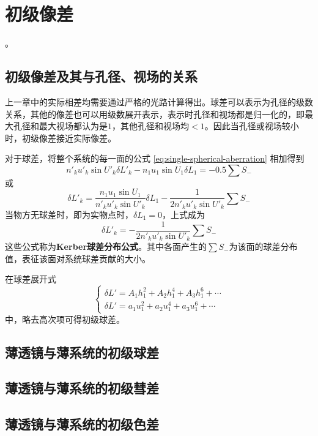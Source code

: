 \chapter{初级像差}。

\section{初级像差及其与孔径、视场的关系}

上一章中的实际相差均需要通过严格的光路计算得出。球差可以表示为孔径的级数关系，其他的像差也可以用级数展开表示，表示时孔径和视场都是归一化的，即最大孔径和最大视场都认为是$1$，其他孔径和视场均$<1$。因此当孔径或视场较小时，初级像差接近实际像差。

对于球差，将整个系统的每一面的公式 \eqref{eq:single-spherical-aberration} 相加得到
\begin{equation}
n'_ku'_k\sin U'_k\delta L'_k-n_1u_1\sin U_1\delta L_1=-0.5\sum S_{-}
\end{equation}
或
\begin{equation}
\delta L'_k=\frac{n_1u_1\sin U_1}{n'_ku'_k\sin U'_k}\delta L_1-\frac{1}{2n'_ku'_k\sin U'_k}\sum S_{-}
\end{equation}
当物方无球差时，即为实物点时，$\delta L_1=0$，上式成为
\begin{equation}
\delta L'_k=-\frac{1}{2n'_ku'_k\sin U'_k}\sum S_{-}
\end{equation}
这些公式称为\textbf{Kerber球差分布公式}。其中各面产生的$\sum S_{-}$为该面的球差分布值，表征该面对系统球差贡献的大小。

在球差展开式
\begin{equation}
\begin{cases}
\delta L'=A_1h^2_1+A_2h^4_1+A_3h^6_1+\cdots\\
\delta L'=a_1u^2_1+a_2u^4_1+a_3u^6_1+\cdots
\end{cases}
\end{equation}
中，略去高次项可得初级球差。

\section{薄透镜与薄系统的初级球差}

\section{薄透镜与薄系统的初级彗差}

\section{薄透镜与薄系统的初级色差}

